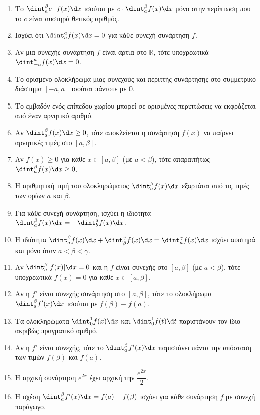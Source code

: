 \begin{enumerate}[label=\textbf{3.\arabic*.}]
    \item Το $\dint_{a}^{\beta} c \cdot f(x) \d x$ ισούται με $c \cdot \dint_{a}^{\beta} f(x) \d x$ μόνο στην περίπτωση που το $c$ είναι αυστηρά θετικός αριθμός.
    \item Ισχύει ότι $\dint_{a}^{a} f(x)\d x = 0$ για κάθε συνεχή συνάρτηση $f$.
    \item Αν μια συνεχής συνάρτηση $f$ είναι άρτια στο $\mathbb{R}$, τότε υποχρεωτικά $\dint_{-a}^{a} f(x)\d x = 0$.
    \item Το ορισμένο ολοκλήρωμα μιας συνεχούς και περιττής συνάρτησης στο συμμετρικό διάστημα $[-a, a]$ ισούται πάντοτε με 0.
    \item Το εμβαδόν ενός επίπεδου χωρίου μπορεί σε ορισμένες περιπτώσεις να εκφράζεται από έναν αρνητικό αριθμό.
    \item Αν $\dint_a^\beta f(x)\d x \ge 0$, τότε αποκλείεται η συνάρτηση $f(x)$ να παίρνει αρνητικές τιμές στο $[a,\beta]$.
    \item Αν $f(x) \ge 0$ για κάθε $x \in [a,\beta]$ (με $a<\beta$), τότε απαραιτήτως $\dint_a^\beta f(x)\d x \ge 0$.
    \item Η αριθμητική τιμή του ολοκληρώματος $\dint_{a}^{\beta} f(x) \d x$ εξαρτάται από τις τιμές των ορίων $a$ και $\beta$.
    \item Για κάθε συνεχή συνάρτηση, ισχύει η ιδιότητα $\dint_a^\beta f(x) \d x = - \dint_b^a f(x) \d x$.
    \item Η ιδιότητα $\dint_a^\beta f(x) \d x + \dint_\beta^\gamma f(x) \d x = \dint_a^\gamma f(x) \d x$ ισχύει αυστηρά και μόνο όταν $a < \beta < \gamma$.
    \item Αν $\dint_{a}^{\beta} |f(x)|\d x = 0$ και η $f$ είναι συνεχής στο $[a, \beta]$ (με $a<\beta$), τότε υποχρεωτικά $f(x) = 0$ για κάθε $x \in [a, \beta]$.
    \item Αν η $f'$ είναι συνεχής συνάρτηση στο $[a, \beta]$, τότε το ολοκλήρωμα $\dint_{a}^{\beta} f'(x)\d x$ ισούται με $f(\beta) - f(a)$.
    \item Τα ολοκληρώματα $\dint_0^1 f(x)\d x$ και $\dint_0^1 f(t)\d t$ παριστάνουν τον ίδιο ακριβώς πραγματικό αριθμό.
    \item Αν η $f'$ είναι συνεχής, τότε το $\dint_a^\beta f'(x) \d x$ παριστάνει πάντα την απόσταση των τιμών $f(\beta)$ και $f(a)$.
    \item Η αρχική συνάρτηση $e^{2x}$ έχει αρχική την $\dfrac{e^{2x}}{2}$.
    \item Η σχέση $\dint_a^\beta f'(x)\d x = f(a) - f(\beta)$ ισχύει για κάθε συνάρτηση $f$ με συνεχή παράγωγο.

\end{enumerate}
